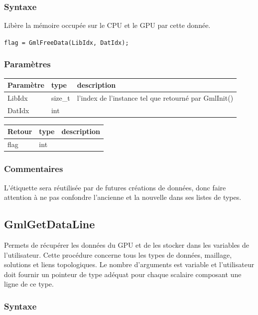 \documentclass[a4paper,12pt]{article}
\begin{document}
\subsubsection*{Syntaxe}

Libère la mémoire occupée sur le CPU et le GPU par cette donnée.

{\tt flag = GmlFreeData(LibIdx, DatIdx);}

\subsubsection*{Paramètres}

\begin{tabular}{|m{2cm}|m{1.5cm}|m{10.5cm}|}
\hline
Paramètre  & type    & description \\
\hline
LibIdx     & size\_t & l'index de l'instance tel que retourné par GmlInit() \\
\hline
DatIdx     & int     & \\
\hline
\end{tabular}

\medskip

\begin{tabular}{|m{2cm}|m{1.5cm}|m{10.5cm}|}
\hline
Retour     & type   & description \\
\hline
flag       & int    & \\
\hline
\end{tabular}

\subsubsection*{Commentaires}
L'étiquette sera réutilisée par de futures créations de données, donc faire attention à ne pas confondre l'ancienne et la nouvelle dans ses listes de types.


\subsection{GmlGetDataLine}

Permets de récupérer les données du GPU et de les stocker dans les variables de l'utilisateur.
Cette procédure concerne tous les types de données, maillage, solutions et liens topologiques.
Le nombre d'arguments est variable et l'utilisateur doit fournir un pointeur de type adéquat pour chaque scalaire composant une ligne de ce type.

\subsubsection*{Syntaxe}
\end{document}
